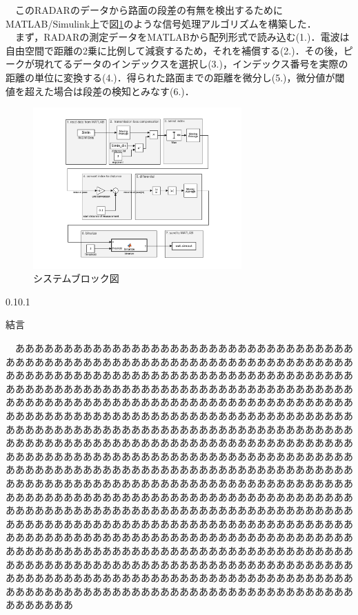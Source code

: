\documentclass[autodetect-engine, dvipdfmx-if-dvi, ja=standard]{bxjsarticle}
\makeatletter
\renewcommand{\section}{%
    \@startsection{section}{1}{\z@}%
    {0.1\Cvs}{0.1\Cvs}%
    {\normalfont\large\headfont\raggedright}}
\makeatother
\begin{document}
\begin{multicols}{2}
　このRADARのデータから路面の段差の有無を検出するためにMATLAB/Simulink上で図\ref{fig:system_block}のような信号処理アルゴリズムを構築した．\\
　まず，RADARの測定データをMATLABから配列形式で読み込む(1.)．電波は自由空間で距離の2乗に比例して減衰するため，それを補償する(2.)．その後，ピークが現れてるデータのインデックスを選択し(3.)，インデックス番号を実際の距離の単位に変換する(4.)．得られた路面までの距離を微分し(5.)，微分値が閾値を超えた場合は段差の検知とみなす(6.)．
\begin{figure}[H]
  \centering
  \includegraphics[width=8cm]{../thesis/fig/System_Block_BW.pdf}
  \caption{システムブロック図}
  \label{fig:system_block}
\end{figure}



\section{結言}
　

　ああああああああああああああああああああああああああああああああああああああああああああああああああああああああああああああああああああああああああああああああああああああああああああああああああああああああああああああああああああああああああああああああああああああああああああああああああああああああああああああああああああああああああああああああああああああああああああああああああああああああああああああああああああああああああああああああああああああああああああああああああああああああああああああああああああああああああああああああああああああああああああああああああああああああああああああああああああああああああああああああああああああああああああああああああああああああああああああああああああああああああああああああああああああああああああああああああああああああああああああああああああああああああああああああああああああああああああああああああああああああああああああああああああああああああああああああああああああああああああああああああああああああああああああああああああああああああああああああああああああああああああああああああああああああああああああああああああああああああああああああああああああああああああああああああああああああああああああああああああああああああああああああああああああああああああああああああああああああああああああああああああああああああああああああああああああああああああああああああああああああああああああああああ

\end{multicols}
\end{document}
